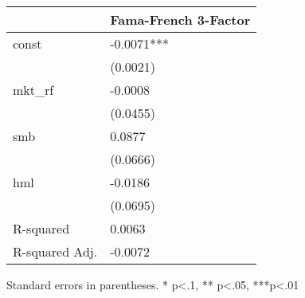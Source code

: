 \begin{table}
\caption{}
\label{}
\begin{center}
\begin{tabular}{ll}
\hline
               & Fama-French 3-Factor  \\
\hline
const          & -0.0071***            \\
               & (0.0021)              \\
mkt\_rf        & -0.0008               \\
               & (0.0455)              \\
smb            & 0.0877                \\
               & (0.0666)              \\
hml            & -0.0186               \\
               & (0.0695)              \\
R-squared      & 0.0063                \\
R-squared Adj. & -0.0072               \\
\hline
\end{tabular}
\end{center}
\end{table}
\bigskip
Standard errors in parentheses. \newline 
* p<.1, ** p<.05, ***p<.01